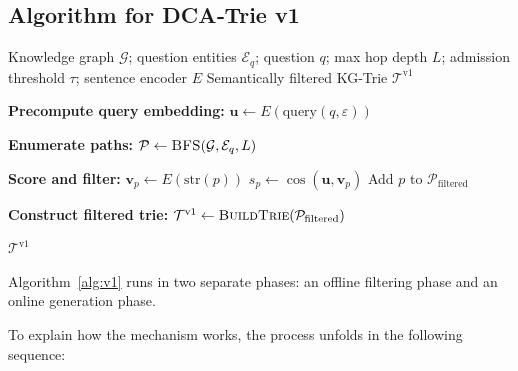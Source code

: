 \subsection{Algorithm for DCA‑Trie v1}


\begin{algorithm}[H]
  \caption{DCA‑Trie v1: Static Semantic Filtering at Construction Time}
  \label{alg:v1}
  \small
  \begin{algorithmic}[1]
    \Require Knowledge graph $\mathcal{G}$; question entities $\mathcal{E}_q$;
    question $q$; max hop depth $L$; admission threshold $\tau$;
    sentence encoder $E$
    \Ensure Semantically filtered KG‑Trie $\mathcal{T}^{\text{v1}}$

    \State \textbf{Precompute query embedding:}
    $\mathbf{u} \gets E(\text{query}(q, \varepsilon))$

    \State \textbf{Enumerate paths:}
    $\mathcal{P} \gets \textsc{BFS}(\mathcal{G}, \mathcal{E}_q, L)$

    \State \textbf{Score and filter:}
    \State $\mathbf{v}_p \gets E(\text{str}(p))$
    \State $s_p \gets \cos(\mathbf{u}, \mathbf{v}_p)$
    \State Add $p$ to $\mathcal{P}_{\text{filtered}}$
    \EndIf
    \EndFor

    \State \textbf{Construct filtered trie:}
    $\mathcal{T}^{\text{v1}} \gets \textsc{BuildTrie}(\mathcal{P}_{\text{filtered}})$

    \State \Return $\mathcal{T}^{\text{v1}}$
  \end{algorithmic}
\end{algorithm}

Algorithm~\ref{alg:v1} runs in two separate phases: an offline filtering phase and an online generation phase.

To explain how the mechanism works, the process unfolds in the following sequence:

